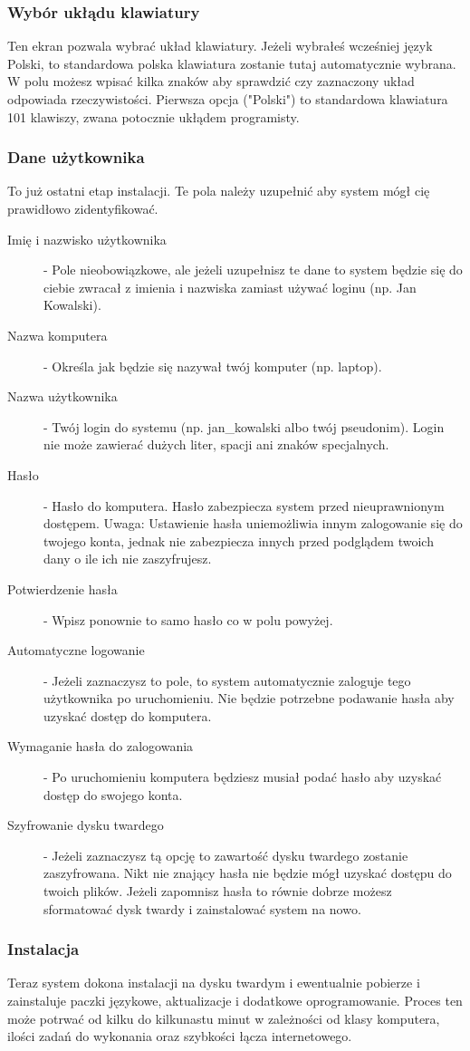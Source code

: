 \subsubsection{Wybór ukłądu klawiatury}
Ten ekran pozwala wybrać układ klawiatury. Jeżeli wybrałeś wcześniej język Polski, to standardowa polska klawiatura zostanie tutaj automatycznie wybrana. W polu możesz wpisać kilka znaków aby sprawdzić czy zaznaczony układ odpowiada rzeczywistości. Pierwsza opcja ("Polski") to standardowa klawiatura 101 klawiszy, zwana potocznie ukłądem programisty.
\subsubsection{Dane użytkownika}
To już ostatni etap instalacji. Te pola należy uzupełnić aby system mógł cię prawidłowo zidentyfikować.
\begin{description}
\item[Imię i nazwisko użytkownika] - Pole nieobowiązkowe, ale jeżeli uzupełnisz te dane to system będzie się do ciebie zwracał z imienia i nazwiska zamiast używać loginu (np. Jan Kowalski).
\item[Nazwa komputera] - Określa jak będzie się nazywał twój komputer (np. laptop).
\item[Nazwa użytkownika] - Twój login do systemu (np. jan\_kowalski albo twój pseudonim). Login nie może zawierać dużych liter, spacji ani znaków specjalnych.
\item[Hasło] - Hasło do komputera. Hasło zabezpiecza system przed nieuprawnionym dostępem. Uwaga: Ustawienie hasła uniemożliwia innym zalogowanie się do twojego konta, jednak nie zabezpiecza innych przed podglądem twoich dany o ile ich nie zaszyfrujesz. 
\item[Potwierdzenie hasła] - Wpisz ponownie to samo hasło co w polu powyżej.
\item[Automatyczne logowanie] - Jeżeli zaznaczysz to pole, to system automatycznie zaloguje tego użytkownika po uruchomieniu. Nie będzie potrzebne podawanie hasła aby uzyskać dostęp do komputera.
\item[Wymaganie hasła do zalogowania] - Po uruchomieniu komputera będziesz musiał podać hasło aby uzyskać dostęp do swojego konta.
\item[Szyfrowanie dysku twardego] - Jeżeli zaznaczysz tą opcję to zawartość dysku twardego zostanie zaszyfrowana. Nikt nie znający hasła nie będzie mógł uzyskać dostępu do twoich plików. Jeżeli zapomnisz hasła to równie dobrze możesz sformatować dysk twardy i zainstalować system na nowo.
\end{description}
\subsubsection{Instalacja}
Teraz system dokona instalacji na dysku twardym i ewentualnie pobierze i zainstaluje paczki językowe, aktualizacje i dodatkowe oprogramowanie. Proces ten może potrwać od kilku do kilkunastu minut w zależności od klasy komputera, ilości zadań do wykonania oraz szybkości łącza internetowego.